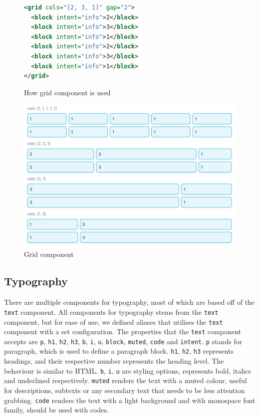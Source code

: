 \begin{figure}[htb]
\begin{minipage}{\linewidth}
\begin{lstlisting}[language=xml]
<grid cols="[2, 3, 1]" gap="2">
  <block intent="info">2</block>
  <block intent="info">3</block>
  <block intent="info">1</block>
  <block intent="info">2</block>
  <block intent="info">3</block>
  <block intent="info">1</block>
</grid>
\end{lstlisting}
\end{minipage}
\caption{How grid component is used}%
\label{fig:grid_xml}%
\end{figure}

\begin{figure}[htb]
  \centering
  \includegraphics[width=13cm]{thesis/paper/images/grid.png}
  \caption{Grid component}%
  \label{fig:grid}%
\end{figure}

\subsection{Typography}

There are multiple components for typography, most of which are based off of the \texttt{text} component. All components for typography stems from the \texttt{text} component, but for ease of use, we defined aliases that utilises the \texttt{text} component with a set configuration. The properties that the \texttt{text} component accepts are \texttt{p}, \texttt{h1}, \texttt{h2}, \texttt{h3}, \texttt{b}, \texttt{i}, \texttt{u}, \texttt{block}, \texttt{muted}, \texttt{code} and \texttt{intent}. \texttt{p} stands for paragraph, which is used to define a paragraph block. \texttt{h1}, \texttt{h2}, \texttt{h3} represents headings, and their respective number represents the heading level. The behaviour is similar to HTML. \texttt{b}, \texttt{i}, \texttt{u} are styling options, represents bold, italics and underlined respectively. \texttt{muted} renders the text with a muted colour, useful for descriptions, subtexts or any secondary text that needs to be less attention grabbing. \texttt{code} renders the text with a light background and with monospace font family, should be used with codes. 

